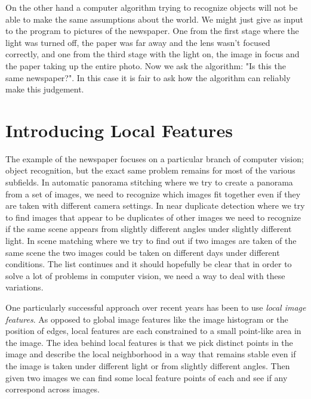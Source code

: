 On the other hand a computer algorithm trying to recognize objects will 
not be able to make the same assumptions about the world. We might just 
give as input to the program to pictures of the newspaper. One from the 
first stage where the light was turned off, the paper was far away and 
the lens wasn't focused correctly, and one from the third stage with the 
light on, the image in focus and the paper taking up the entire photo.  
Now we ask the algorithm: "Is this the same newspaper?". In this case it 
is fair to ask how the algorithm can reliably make this judgement.

\section{Introducing Local Features}

The example of the newspaper focuses on a particular branch of computer 
vision; object recognition, but the exact same problem remains for most 
of the various subfields. In automatic panorama stitching where we try 
to create a panorama from a set of images, we need to recognize which 
images fit together even if they are taken with different camera 
settings. In near duplicate detection where we try to find images that 
appear to be duplicates of other images we need to recognize if the same 
scene appears from slightly different angles under slightly different 
light. In scene matching where we try to find out if two images are 
taken of the same scene the two images could be taken on different days 
under different conditions. The list continues and it should hopefully 
be clear that in order to solve a lot of problems in computer vision, we 
need a way to deal with these variations.

One particularly successful approach over recent years has been to use 
\emph{local image features}. As opposed to global image features like 
the image histogram or the position of edges, local features are each 
constrained to a small point-like area in the image. The idea behind 
local features is that we pick distinct points in the image and describe 
the local neighborhood in a way that remains stable even if the image is 
taken under different light or from slightly different angles. Then 
given two images we can find some local feature points of each and see 
if any correspond across images.

